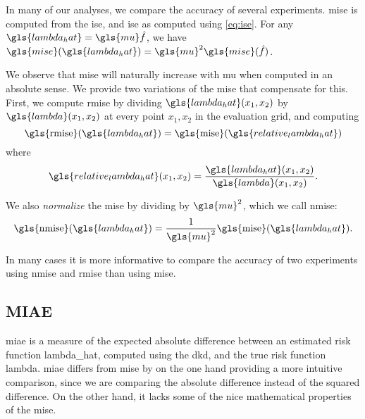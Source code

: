 In many of our analyses, we compare the accuracy of several experiments.
\gls{mise} is computed from the \gls{ise},
and \gls{ise} as computed using \cref{eq:ise}.
For any \(\gls{lambda_hat} = \gls{mu} \hat f \),
we have \( \gls{mise}(\gls{lambda_hat}) = \gls{mu}^2 \gls{mise}(\hat f) \).

We observe that \gls{mise} will naturally increase with \gls{mu} when computed in an absolute sense.
We provide two variations of the \gls{mise} that compensate for this.
First, we compute \gls{rmise} by dividing \(\gls{lambda_hat}(x_1, x_2)\) by \(\gls{lambda}(x_1, x_2)\) at every point \(x_1, x_2\) in the evaluation grid, and computing
\begin{equation}
\label{eq:rmise}
    \mbox{\gls{rmise}}(\gls{lambda_hat}) = 
        \mbox{\gls{mise}}(\gls{relative_lambda_hat}) \\
\end{equation}
where
\begin{equation}
\label{eq:relative_lambda_hat}
    \gls{relative_lambda_hat}(x_1, x_2) = 
        \frac{\gls{lambda_hat}(x_1, x_2)}{\gls{lambda}(x_1, x_2)}
        \text{.}
\end{equation}

We also \textit{normalize} the \gls{mise} by dividing by \(\gls{mu}^2\),
which we call \gls{nmise}:
\begin{equation}
\label{eq:nmise}
    \mbox{\gls{nmise}}(\gls{lambda_hat}) = 
        \frac{1}{\gls{mu}^2} \mbox{\gls{mise}}(\gls{lambda_hat}) \text{.}
\end{equation}

In many cases it is more informative to compare the accuracy of two experiments using \gls{nmise} and \gls{rmise} than using \gls{mise}.

\subsection{MIAE}
\label{subsec:method:miae}

\Gls{miae} is a measure of the expected absolute difference between an estimated risk function \gls{lambda_hat},
computed using the \gls{dkd}, and the true risk function \gls{lambda}.
\Gls{miae} differs from \gls{mise} by on the one hand providing a more intuitive comparison,
since we are comparing the absolute difference instead of the squared difference.
On the other hand, it lacks some of the nice mathematical properties of the \gls{mise}.

